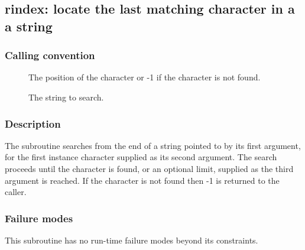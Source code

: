 \clearpage
{}
{}
\label{subr:rindex}
\subsection*{rindex: locate the last matching character in a a string}

\subsubsection*{Calling convention}

\begin{description}
\item[] The position of the character or -1 if the
  character is not found.
\item[] The string to search.
\end{description}

\subsubsection*{Description}

The  subroutine searches from the end of a string
pointed to by its first argument, for the first instance character
supplied as its second argument.  The search proceeds until the
character is found, or an optional limit, supplied as the third
argument is reached.  If the character is not found then -1 is
returned to the caller.

\subsubsection*{Failure modes}

This subroutine has no run-time failure modes beyond its constraints.
